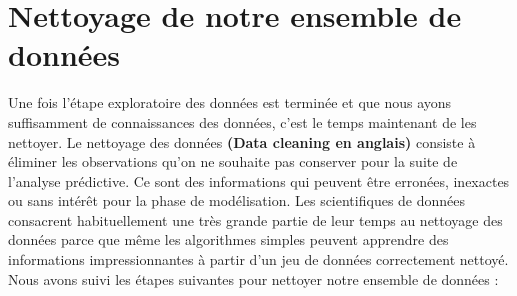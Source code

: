 \documentclass[12pt, french]{report}
\begin{document}
\section{Nettoyage de notre ensemble de données}
Une fois l'étape exploratoire des données est terminée et que nous ayons suffisamment de connaissances des données, c'est le temps maintenant de les nettoyer. Le nettoyage des données \textbf{(Data cleaning en anglais)} consiste à éliminer les observations qu'on ne souhaite pas conserver pour la suite de l'analyse prédictive. Ce sont des informations qui peuvent être erronées, inexactes ou sans intérêt pour la phase de modélisation. Les scientifiques de données consacrent habituellement une très grande partie de leur temps au nettoyage des données  parce que même les algorithmes simples peuvent apprendre des informations impressionnantes à partir d'un jeu de données correctement nettoyé. \\

Nous avons suivi les étapes suivantes pour nettoyer notre ensemble de données :
\end{document}
